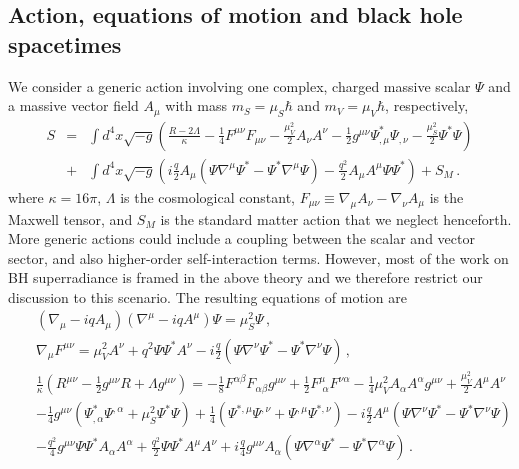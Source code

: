 \documentclass[11pt]{article}
\def\beq{\begin{eqnarray}}
\def\eeq{\end{eqnarray}}
\numberwithin{equation}{section} %
\begin{document}
\subsection{Action, equations of motion and black hole spacetimes}\label{sec:kerr}
We consider a generic action involving one complex, charged massive scalar $\Psi$ and a massive vector
field $A_{\mu}$ with mass $m_S = \mu_S \hbar$ and $m_V=\mu_V\hbar$,
respectively,
%
\beq
S&=&\int d^4x \sqrt{-g} \left( \frac{R-2\Lambda}{\kappa} - \frac{1}{4}F^{\mu\nu}F_{\mu\nu}- \frac{\mu_V^2}{2}A_{\nu}A^{\nu}
-\frac{1}{2}g^{\mu\nu}\Psi^{\ast}_{,\mu}\Psi^{}_{,\nu} - \frac{\mu_S^2}{2}\Psi^{\ast}\Psi %
\right)\nonumber\\
%
&+&\int d^4x \sqrt{-g}\left(i\frac{q}{2}A_{\mu}\left(\Psi\nabla^{\mu}\Psi^{\ast}-\Psi^{\ast}\nabla^{\mu}\Psi\right)-\frac{q^2}{2}A_{\mu}A^{\mu}\Psi\Psi^{\ast}
\right)+S_M       
\,.\label{eq:MFaction}
\eeq
%
where $\kappa=16\pi$, $\Lambda$ is the cosmological constant, $F_{\mu\nu} \equiv
\nabla_{\mu}A_{\nu} - \nabla_{\nu} A_{\mu}$ is the Maxwell tensor, and $S_M$ is the standard matter action that we neglect henceforth.
More generic actions could include a coupling between the scalar and vector sector, 
and also higher-order self-interaction terms. However, most of the work on BH superradiance is framed
in the above theory and we therefore restrict our discussion to this scenario.
%
The resulting equations of motion are
%
\begin{subequations}
\label{eq:MFEoMgen}
\begin{eqnarray}
  \label{eq:MFEoMScalar}
  &&\left(\nabla_{\mu}-iqA_{\mu}\right)\left(\nabla^{\mu}-iqA^{\mu}\right)\Psi =\mu_S^2\Psi
			\,,\\
  \label{eq:MFEoMVector}
  &&\nabla_{\mu} F^{\mu\nu} =
      \mu_V^2A^\nu+q^2\Psi\Psi^{\ast}A^{\nu}-i\frac{q}{2}\left(\Psi\nabla^{\nu}\Psi^{\ast}-\Psi^{\ast}\nabla^{\nu}\Psi\right) \,,\\
  \label{eq:MFEoMTensor}
  &&\frac{1}{\kappa} \left(R^{\mu \nu} - \frac{1}{2}g^{\mu\nu}R+\Lambda g^{\mu\nu}\right) =
      - \frac{1}{8}F^{\alpha\beta}F_{\alpha\beta}g^{\mu\nu}+\frac{1}{2}F^{\mu}_{\,\,\alpha}F^{\nu\alpha}
      - \frac{1}{4}\mu_V^2A_{\alpha}A^{\alpha}g^{\mu\nu}+\frac{\mu_V^2}{2}A^{\mu}A^{\nu}
      \nonumber\\
%
   && -\frac{1}{4}g^{\mu\nu}\left( \Psi^{\ast}_{,\alpha}\Psi^{,\alpha}+{\mu_S^2}\Psi^{\ast}\Psi\right)
      +\frac{1}{4}\left( \Psi^{\ast,\mu}\Psi^{,\nu}+ \Psi^{,\mu}\Psi^{\ast,\nu} \right)-i\frac{q}{2}A^{\mu}\left(\Psi\nabla^{\nu}\Psi^{\ast}-\Psi^{\ast}\nabla^{\nu}\Psi\right) \nonumber\\
%
   &&-\frac{q^2}{4}g^{\mu\nu}\Psi\Psi^{\ast}A_{\alpha}A^{\alpha}+\frac{q^2}{2} \Psi\Psi^{\ast}A^{\mu}A^{\nu}+i\frac{q}{4}g^{\mu\nu}A_{\alpha}\left(\Psi\nabla^{\alpha}\Psi^{\ast}-\Psi^{\ast}\nabla^{\alpha}\Psi\right)\,.
\end{eqnarray}
\end{subequations}
%
\end{document}
